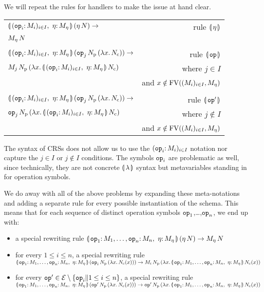 We will repeat the rules for handlers to make the issue at hand clear.

\begin{tabular}{lr}
  $\ap{\cibanana}{(\ap{\eta}{N})} \to$ & rule $\llparenthesis \, \eta \, \rrparenthesis$ \\
  $M_\eta\,N$ & \\
  \\
  $\ap{\cibanana}{(\ap{\ap{\op{op}_j}{N_{\mathrm{p}}}}{(\lam{x}{N_{\mathrm{c}}})})} \to$ & rule $\llparenthesis \, \mathtt{op} \, \rrparenthesis$ \\
  $\ap{M_j}{\ap{N_{\mathrm{p}}}{(\lam{x}{\ap{\cibanana}{N_{\mathrm{c}}}})}}$
  & where $j \in I$ \\
  & and $x \notin \operatorname{FV}((M_i)_{i \in I}, M_\eta)$ \\
  \\
  $\ap{\cibanana}{(\ap{\ap{\op{op}_j}{N_{\mathrm{p}}}}{(\lam{x}{N_{\mathrm{c}}})})} \to$ & rule $\llparenthesis \, \mathtt{op}' \, \rrparenthesis$ \\
  $\ap{\op{op}_j}{\ap{N_{\mathrm{p}}}{(\lam{x}{\ap{\cibanana}{N_{\mathrm{c}}}})}}$
  & where $j \notin I$ \\
  & and $x \notin \operatorname{FV}((M_i)_{i \in I}, M_\eta)$
\end{tabular}

The syntax of CRSs does not allow us to use the $(\onto{\op{op}_i}{M_i})_{i
  \in I}$ notation nor capture the $j \in I$ or $j \notin I$ conditions.
The symbols $\mathtt{op}_i$ are problematic as well, since technically, they
are not concrete $\llparenthesis \, \lambda \, \rrparenthesis$ syntax but metavariables standing in for
operation symbols.

We do away with all of the above problems by expanding these meta-notations
and adding a separate rule for every possible instantiation of the
schema. This means that for each sequence of distinct operation symbols
$\mathtt{op}_1$,\ldots,$\mathtt{op}_n$, we end up with:
\begin{itemize}
\item a special rewriting rule
  $\ap{\banana{\onto{\op{op}_1}{M_1},\ldots,\onto{\op{op}_n}{M_n},\ 
    \onto{\eta}{M_\eta}}}{(\etaE{N})}
  \to \ap{M_\eta}{N}$
\item for every $1 \le i \le n$, a special rewriting rule \\
  $\ap{\banana{\onto{\op{op}_1}{M_1},\ldots,\onto{\op{op}_n}{M_n},\ 
    \onto{\eta}{M_\eta}}}{(\app{\op{op}_i}{N_{\mathrm{p}}}{(\lam{x}{N_{\mathrm{c}}(x)})})}
  \\ \to
  \app{M_i}{N_{\mathrm{p}}}{(\lam{x}{\ap{\banana{\onto{\op{op}_1}{M_1},\ldots,\onto{\op{op}_n}{M_n},\ \onto{\eta}{M_\eta}}}{N_{\mathrm{c}}(x)}})}$
\item for every $\mathtt{op}' \in \mathcal{E} \setminus \{\mathtt{op}_i \| 1 \le i \le n\}$, a special
  rewriting rule \\
  $\ap{\banana{\onto{\op{op}_1}{M_1},\ldots,\onto{\op{op}_n}{M_n},\ 
    \onto{\eta}{M_\eta}}}{(\app{\op{op}'}{N_{\mathrm{p}}}{(\lam{x}{N_{\mathrm{c}}(x)})})}
  \\ \to
  \app{\op{op}'}{N_{\mathrm{p}}}{(\lam{x}{\ap{\banana{\onto{\op{op}_1}{M_1},\ldots,\onto{\op{op}_n}{M_n},\ \onto{\eta}{M_\eta}}}{N_{\mathrm{c}}(x)}})}$
\end{itemize}

